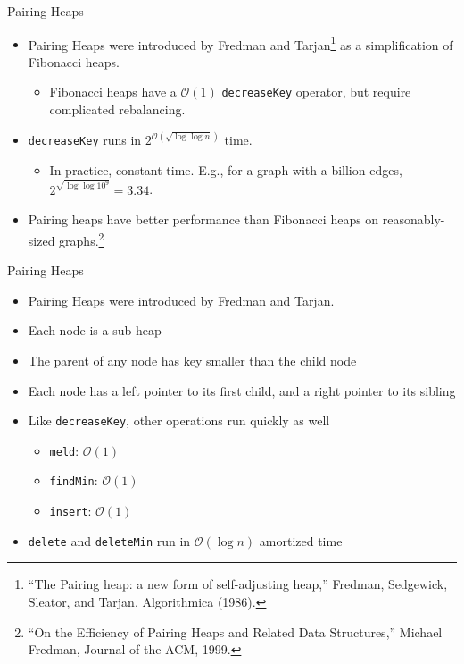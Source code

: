 \documentclass{beamer}
\begin{document}
\begin{frame}{Pairing Heaps}
  \begin{itemize}
    \item Pairing Heaps were introduced by Fredman and Tarjan\footnote{``The Pairing heap: a new form of self-adjusting heap,'' Fredman, Sedgewick, Sleator, and Tarjan, Algorithmica (1986).} as a simplification of Fibonacci heaps.
     \begin{itemize}
        \item Fibonacci heaps have a $\mathcal{O}(1)$ \texttt{decreaseKey} operator, but require complicated rebalancing.
      \end{itemize}
    \item \texttt{decreaseKey} runs in $2^{\mathcal{O}(\sqrt{\log \log n})}$ time.
        \begin{itemize}
          \item In practice, constant time. E.g., for a graph with a billion edges, $2^{\sqrt{\log \log 10^9}} = 3.34$.
        \end{itemize}
      \item Pairing heaps have better performance than Fibonacci heaps on reasonably-sized graphs.\footnote{``On the Efficiency of Pairing Heaps and Related Data Structures,'' Michael Fredman, Journal of the ACM, 1999.}
  \end{itemize}
\end{frame}

\begin{frame}{Pairing Heaps}
  \begin{itemize}
    \item Pairing Heaps were introduced by Fredman and Tarjan.
    \item Each node is a sub-heap
    \item The parent of any node has key smaller than the child node
    \item Each node has a left pointer to its first child, and a right pointer to its sibling
    \item Like \texttt{decreaseKey}, other operations run quickly as well
    	\begin{itemize}
    	\item \texttt{meld}: $\mathcal{O}(1)$
    	\item \texttt{findMin}: $\mathcal{O}(1)$
    	\item \texttt{insert}: $\mathcal{O}(1)$
    	\end{itemize}
    \item \texttt{delete} and \texttt{deleteMin} run in $\mathcal{O}(\log n)$ amortized time     
  \end{itemize}
\end{frame}
\end{document}
